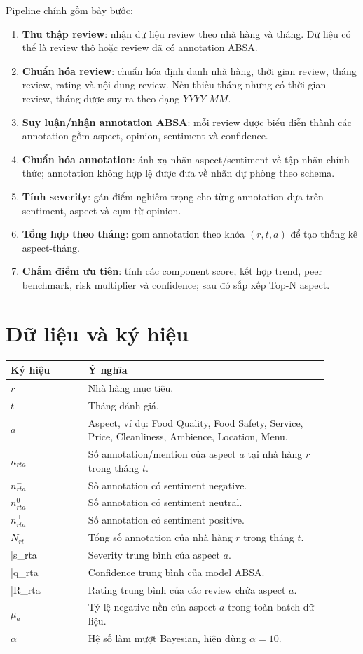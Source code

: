 \documentclass[12pt,a4paper]{article}
\begin{document}
Pipeline chính gồm bảy bước:

\begin{enumerate}
  \item \textbf{Thu thập review}: nhận dữ liệu review theo nhà hàng và tháng. Dữ liệu có thể là review thô hoặc review đã có annotation ABSA.
  \item \textbf{Chuẩn hóa review}: chuẩn hóa định danh nhà hàng, thời gian review, tháng review, rating và nội dung review. Nếu thiếu tháng nhưng có thời gian review, tháng được suy ra theo dạng $YYYY$-$MM$.
  \item \textbf{Suy luận/nhận annotation ABSA}: mỗi review được biểu diễn thành các annotation gồm aspect, opinion, sentiment và confidence.
  \item \textbf{Chuẩn hóa annotation}: ánh xạ nhãn aspect/sentiment về tập nhãn chính thức; annotation không hợp lệ được đưa về nhãn dự phòng theo schema.
  \item \textbf{Tính severity}: gán điểm nghiêm trọng cho từng annotation dựa trên sentiment, aspect và cụm từ opinion.
  \item \textbf{Tổng hợp theo tháng}: gom annotation theo khóa $(r,t,a)$ để tạo thống kê aspect-tháng.
  \item \textbf{Chấm điểm ưu tiên}: tính các component score, kết hợp trend, peer benchmark, risk multiplier và confidence; sau đó sắp xếp Top-N aspect.
\end{enumerate}

\section{Dữ liệu và ký hiệu}

\begin{longtable}{p{0.22\linewidth}p{0.68\linewidth}}
\toprule
\textbf{Ký hiệu} & \textbf{Ý nghĩa}\\
\midrule
$r$ & Nhà hàng mục tiêu.\\
$t$ & Tháng đánh giá.\\
$a$ & Aspect, ví dụ: Food Quality, Food Safety, Service, Price, Cleanliness, Ambience, Location, Menu.\\
$n_{rta}$ & Số annotation/mention của aspect $a$ tại nhà hàng $r$ trong tháng $t$.\\
$n^{-}_{rta}$ & Số annotation có sentiment negative.\\
$n^{0}_{rta}$ & Số annotation có sentiment neutral.\\
$n^{+}_{rta}$ & Số annotation có sentiment positive.\\
$N_{rt}$ & Tổng số annotation của nhà hàng $r$ trong tháng $t$.\\
\bar{s}_{rta} & Severity trung bình của aspect $a$.\\
\bar{q}_{rta} & Confidence trung bình của model ABSA.\\
\bar{R}_{rta} & Rating trung bình của các review chứa aspect $a$.\\
$\mu_a$ & Tỷ lệ negative nền của aspect $a$ trong toàn batch dữ liệu.\\
$\alpha$ & Hệ số làm mượt Bayesian, hiện dùng $\alpha=10$.\\
\bottomrule
\end{longtable}
\end{document}
